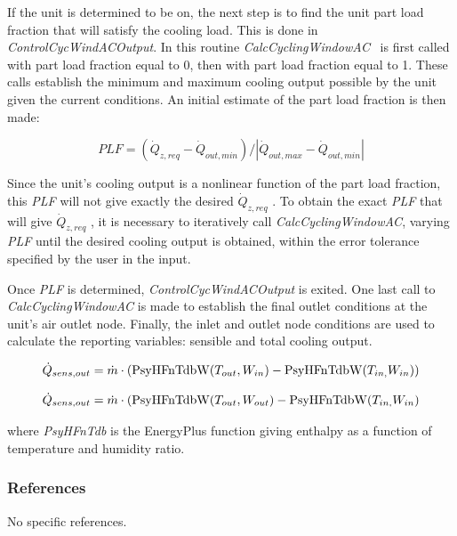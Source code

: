 If the unit is determined to be on, the next step is to find the unit part load fraction that will satisfy the cooling load. This is done in \emph{ControlCycWindACOutput}. In this routine \emph{CalcCyclingWindowAC} ~is first called with part load fraction equal to 0, then with part load fraction equal to 1. These calls establish the minimum and maximum cooling output possible by the unit given the current conditions. An initial estimate of the part load fraction is then made:

\begin{equation}
PLF = ({\dot Q_{z,req}} - {\dot Q_{out,min}})/|{\dot Q_{out,max}} - {\dot Q_{out,min}}|
\end{equation}

Since the unit's cooling output is a nonlinear function of the part load fraction, this \emph{PLF} will not give exactly the desired \({\dot Q_{z,req}}\) . To obtain the exact \emph{PLF} that will give \({\dot Q_{z,req}}\) , it is necessary to iteratively call \emph{CalcCyclingWindowAC}, varying \emph{PLF} until the desired cooling output is obtained, within the error tolerance specified by the user in the input.

Once \emph{PLF} is determined, \emph{ControlCycWindACOutput} is exited. One last call to \emph{CalcCyclingWindowAC} is made to establish the final outlet conditions at the unit's air outlet node. Finally, the inlet and outlet node conditions are used to calculate the reporting variables: sensible and total cooling output.

\begin{equation}
{\dot Q_{sens,out}} = \dot m\cdot ({\mathop{\rm PsyHFnTdbW}\nolimits} ({T_{out}},{W_{in}}) - {\mathop{\rm PsyHFnTdbW}\nolimits} ({T_{in,}}{W_{in}}))
\end{equation}

\begin{equation}
{\dot Q_{sens,out}} = \dot m\cdot ({\mathop{\rm PsyHFnTdbW}\nolimits} ({T_{out}},{W_{out}}) - {\mathop{\rm PsyHFnTdbW}\nolimits} ({T_{in,}}{W_{in}})
\end{equation}

where \emph{PsyHFnTdb} is the EnergyPlus function giving enthalpy as a function of temperature and humidity ratio.

\subsubsection{References}\label{references-5-003}

No specific references.

